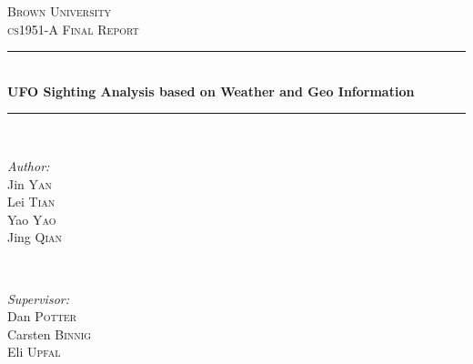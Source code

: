 \begin{titlepage}

\newcommand{\HRule}{\rule{\linewidth}{0.5mm}} %

\center %
 

\textsc{\LARGE Brown University}\\[1.5cm] %
\textsc{\Large cs1951-A Final Report}\\[0.5cm] %



\HRule \\[0.4cm]
{ \large \bfseries UFO Sighting Analysis based on Weather and Geo Information}\\[0.4cm] %
\HRule \\[1.5cm]
 

\begin{minipage}{0.4\textwidth}
\begin{flushleft} \large
\emph{Author:}\\
Jin \textsc{Yan}\\
Lei \textsc{Tian}\\
Yao \textsc{Yao}\\
Jing \textsc{Qian}\\
\end{flushleft}
\end{minipage}
~
\begin{minipage}{0.4\textwidth}
\begin{flushright} \large
\emph{Supervisor:} \\
Dan \textsc{Potter}\\
Carsten \textsc{Binnig}\\
Eli \textsc{Upfal}
\end{flushright}
\end{minipage}\\[2cm]


\end{titlepage}
